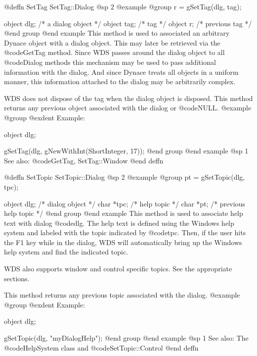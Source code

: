 @deffn {SetTag} SetTag::Dialog
@sp 2
@example
@group
r = gSetTag(dlg, tag);

object  dlg;   /*  a dialog object   */
object  tag;    /*  tag               */
object  r;      /*  previous tag      */
@end group
@end example
This method is used to associated an arbitrary Dynace object with a
dialog object.  This may later be retrieved via the @code{GetTag} method.
Since WDS passes around the dialog object to all @code{Dialog} methods
this mechanism may be used to pass additional information with the
dialog.  And since Dynace treats all objects in a uniform manner, this
information attached to the dialog may be arbitrarily complex.

WDS does not dispose of the tag when the dialog object is disposed.
This method returns any previous object associated with the dialog or
@code{NULL}.
@example
@group
@exdent Example:

object  dlg;

gSetTag(dlg, gNewWithInt(ShortInteger, 17));
@end group
@end example
@sp 1
See also:  @code{GetTag, SetTag::Window}
@end deffn











@deffn {SetTopic} SetTopic::Dialog
@sp 2
@example
@group
pt = gSetTopic(dlg, tpc);

object  dlg;    /*  dialog object         */
char    *tpc;   /*  help topic            */
char    *pt;    /*  previous help topic   */
@end group
@end example
This method is used to associate help text with dialog @code{dlg}.
The help text is defined using the Windows help system and labeled
with the topic indicated by @code{tpc}.  Then, if the user hits
the F1 key while in the dialog, WDS will automatically bring up
the Windows help system and find the indicated topic.

WDS also supports window and control specific topics.  See the appropriate
sections.

This method returns any previous topic associated with the dialog.
@example
@group
@exdent Example:

object  dlg;

gSetTopic(dlg, "myDialogHelp");
@end group
@end example
@sp 1
See also:  The @code{HelpSystem} class and @code{SetTopic::Control} 
@end deffn















